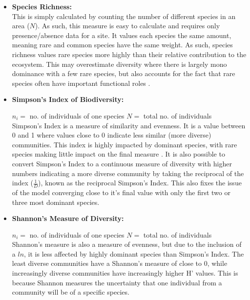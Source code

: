 \documentclass[11pt]{article}
\begin{document}
\begin{itemize}[leftmargin=1em, rightmargin=1em]
    \item[] \textbf{Species Richness:} \\This is simply calculated by counting the number of different species in an area ($N$). As such, this measure is easy to calculate and requires only presence/absence data for a site. It values each species the same amount, meaning rare and common species have the same weight. As such, species richness values rare species more highly than their relative contribution to the ecosystem. This may overestimate diversity where there is largely mono dominance with a few rare species, but also accounts for the fact that rare species often have important functional roles \parencite{Bunker2013,Leitao2016}.
    \item[] \textbf{Simpson's Index of Biodiversity: }
    \begin{center}
    \end{center}
    \quad$n_i = $ no. of individuals of one species \qquad $N = $ total no. of individuals\\
    Simpson's Index \parencite{SIMPSON1949} is a measure of similarity and evenness. It is a value between 0 and 1 where values close to 0 indicate less similar (more diverse) communities. This index is highly impacted by dominant species, with rare species making little impact on the final measure \parencite{Dejong1975}. It is also possible to convert Simpson's Index to a continuous measure of diversity with higher numbers indicating a more diverse community by taking the reciprocal of the index ($\frac{1}{D}$), known as the reciprocal Simpson's Index. This also fixes the issue of the model converging close to it's final value with only the first two or three most dominant species.
    
    \item[] \textbf{Shannon's Measure of Diversity:}
    \begin{center}
    \end{center}
    \quad$n_i = $ no. of individuals of one species \qquad $N = $ total no. of individuals\\
    Shannon's measure \parencite{Shannon1949} is also a measure of evenness, but due to the inclusion of a $ln$, it is less affected by highly dominant species than Simpson's Index. The least diverse communities have a Shannon's measure of close to 0, while increasingly diverse communities have increasingly higher H' values. This is because Shannon measures the uncertainty that one individual from a community will be of a specific species. 
\end{itemize}
\end{document}
